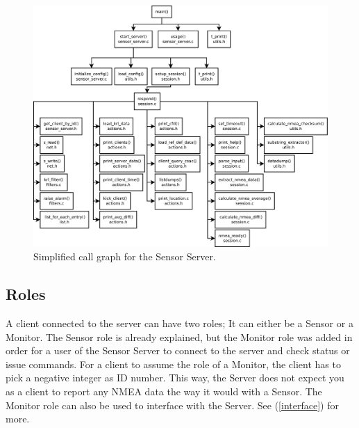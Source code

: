 \documentclass[12pt,english,a4paper]{report}
\begin{document}
\begin{figure}
\centering
  \includegraphics[scale=0.3]{server_call_graph.pdf}
   \caption[Sensor Server simplified call graph]{Simplified call graph for the Sensor Server.}
   \label{server_call_graph}
\end{figure}

\newpage
\subsection{Roles}\label{roles}
A client connected to the server can have two roles; It can either be a Sensor or a Monitor. The Sensor role is already explained, but the Monitor role was added in order for a user of the Sensor Server to connect to the server and check status or issue commands. For a client to assume the role of a Monitor, the client has to pick a negative integer as ID number. This way, the Server does not expect you as a client to report any NMEA data the way it would with a Sensor. The Monitor role can also be used to interface with the Server. See (\ref{interface}) for more.
\end{document}
